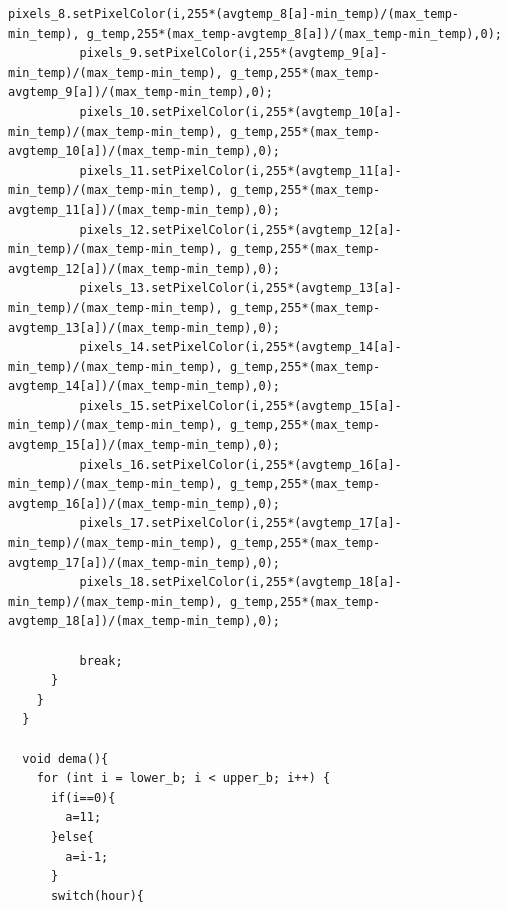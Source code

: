 \documentclass[a4paper,9pt]{article}
\begin{document}
\begin{lstlisting}[basicstyle=\tiny,style=CStyle]
          pixels_8.setPixelColor(i,255*(avgtemp_8[a]-min_temp)/(max_temp-min_temp), g_temp,255*(max_temp-avgtemp_8[a])/(max_temp-min_temp),0);
          pixels_9.setPixelColor(i,255*(avgtemp_9[a]-min_temp)/(max_temp-min_temp), g_temp,255*(max_temp-avgtemp_9[a])/(max_temp-min_temp),0);
          pixels_10.setPixelColor(i,255*(avgtemp_10[a]-min_temp)/(max_temp-min_temp), g_temp,255*(max_temp-avgtemp_10[a])/(max_temp-min_temp),0);
          pixels_11.setPixelColor(i,255*(avgtemp_11[a]-min_temp)/(max_temp-min_temp), g_temp,255*(max_temp-avgtemp_11[a])/(max_temp-min_temp),0);
          pixels_12.setPixelColor(i,255*(avgtemp_12[a]-min_temp)/(max_temp-min_temp), g_temp,255*(max_temp-avgtemp_12[a])/(max_temp-min_temp),0);
          pixels_13.setPixelColor(i,255*(avgtemp_13[a]-min_temp)/(max_temp-min_temp), g_temp,255*(max_temp-avgtemp_13[a])/(max_temp-min_temp),0);
          pixels_14.setPixelColor(i,255*(avgtemp_14[a]-min_temp)/(max_temp-min_temp), g_temp,255*(max_temp-avgtemp_14[a])/(max_temp-min_temp),0);
          pixels_15.setPixelColor(i,255*(avgtemp_15[a]-min_temp)/(max_temp-min_temp), g_temp,255*(max_temp-avgtemp_15[a])/(max_temp-min_temp),0);
          pixels_16.setPixelColor(i,255*(avgtemp_16[a]-min_temp)/(max_temp-min_temp), g_temp,255*(max_temp-avgtemp_16[a])/(max_temp-min_temp),0);
          pixels_17.setPixelColor(i,255*(avgtemp_17[a]-min_temp)/(max_temp-min_temp), g_temp,255*(max_temp-avgtemp_17[a])/(max_temp-min_temp),0);
          pixels_18.setPixelColor(i,255*(avgtemp_18[a]-min_temp)/(max_temp-min_temp), g_temp,255*(max_temp-avgtemp_18[a])/(max_temp-min_temp),0);
         
          break;
      }
    }
  }

  void dema(){
    for (int i = lower_b; i < upper_b; i++) {
      if(i==0){
        a=11;
      }else{
        a=i-1;
      }
      switch(hour){
      

\end{lstlisting}
\end{document}

